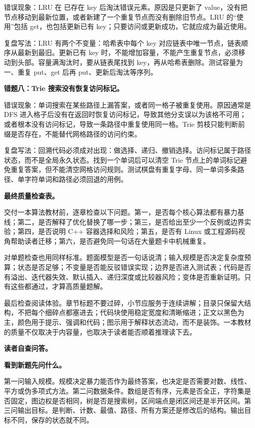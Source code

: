 错误现象：LRU 在  已存在 key 后淘汰错误元素。原因是只更新了 value，没有把节点移动到最新位置，或者新建了一个重复节点而没有删除旧节点。LRU 的“使用”包括 get，也包括更新已有 key；只要访问或更新成功，它就应成为最近使用。

复盘写法：LRU 有两个不变量：哈希表中每个 key 对应链表中唯一节点，链表顺序从最新到最旧。更新已有 key 时，不能增加容量，不能产生重复节点，必须移动到头部。容量满淘汰时，要从链表尾找到 key，再从哈希表删除。测试容量为一、重复 put、get 后再 put、更新后淘汰等序列。

\noindent\textbf{错题八：Trie 搜索没有恢复访问标记。}

错误现象：单词搜索在某些路径上漏答案，或者同一格子被重复使用。原因通常是 DFS 进入格子后没有在返回时恢复访问标记，导致其他分支误以为该格不可用；或者根本没有访问标记，导致一条路径中重复使用同一格。Trie 剪枝只能判断前缀是否存在，不能替代网格路径的访问约束。

复盘写法：回溯代码必须成对出现：做选择、递归、撤销选择。访问标记属于路径状态，而不是全局永久状态。找到一个单词后可以清空 Trie 节点上的单词标记避免重复答案，但不能清空网格访问规则。测试棋盘有重复字母、同一单词多条路径、单字符单词和路径必须回退的用例。

\noindent\textbf{最终质量检查表。}

交付一本算法教材前，逐章检查以下问题。第一，是否每个核心算法都有暴力基线；第二，是否解释了优化替换了哪一步；第三，是否给出至少一个反例或边界实验；第四，是否说明 C++ 容器选择和风险；第五，是否有 Linux 或工程源码视角帮助读者迁移；第六，是否避免同一句话在大量题卡中机械重复。

对单题检查也用同样标准。题面模型是否一句话说清；输入规模是否决定复杂度预算；状态是否足够；不变量是否能反驳错误实现；边界是否进入测试表；代码是否有溢出、迭代器失效、默认插入、递归深度或比较器风险；变体是否重新证明。只有这些都通过，才算高质量题解。

最后检查阅读体验。章节标题不要过碎，小节应服务于连续讲解；目录只保留大结构，不把每个细碎点都塞进去；代码块使用稳定宽度和清晰缩进；正文以黑色为主，颜色用于提示、强调和代码；图示用于解释状态流动，而不是装饰。一本教材的质量不仅取决于内容量，也取决于读者能否顺着推理读下去。

\noindent\textbf{读者自查问答。}

\noindent\textbf{看到新题先问什么。}

第一问输入规模。规模决定暴力能否作为最终答案，也决定是否需要对数、线性、平方或伪多项式方法。第二问数据条件。数组是否有序，元素是否全正，字符集是否固定，图边权是否相同，树是否是搜索树，区间端点是闭区间还是半开区间。第三问输出目标。是判断、计数、最值、路径、所有方案还是修改后的结构。输出目标不同，保存的状态就不同。

